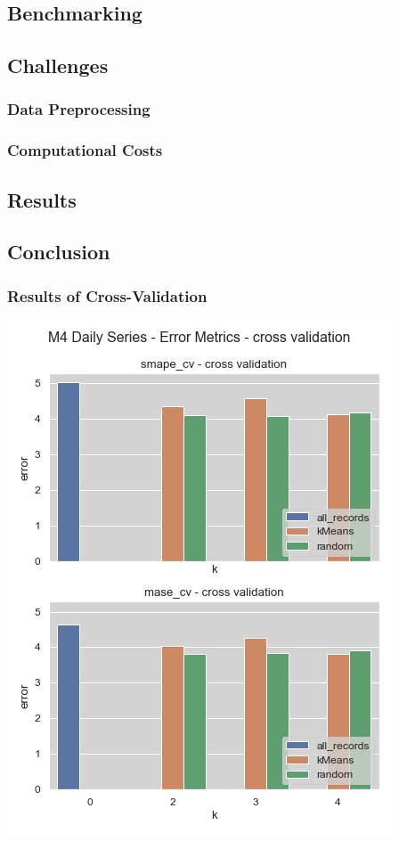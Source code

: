 \documentclass[11pt]{article}
\begin{document}
\subsection*{Benchmarking}
\label{sec:orgf1ac54f}
\subsection*{Challenges}
\label{sec:orgbbd4989}
\subsubsection*{Data Preprocessing}
\label{sec:org6e443f2}
\subsubsection*{Computational Costs}
\label{sec:org3b8bf12}

\subsection*{Results}
\label{sec:orgf761d1f}
\subsection*{Conclusion}
\label{sec:org03020af}
\subsubsection*{Results of Cross-Validation}
\label{sec:org1432392}
\begin{center}
\includegraphics[width=.9\linewidth]{../img/daily_cv_results.png}
\end{center}
\end{document}
